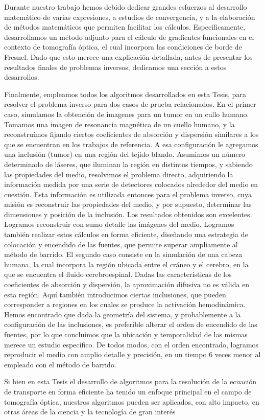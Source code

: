 Durante nuestro trabajo hemos debido dedicar grandes esfuerzos 
al desarrollo matemático de varias expresiones, a estudios de 
convergencia, y a la elaboración de métodos matemáticos que 
permiten facilitar 
los cálculos. Específicamente, desarrollamos un método adjunto para 
el cálculo de gradientes funcionales en el contexto de tomografía óptica, 
el cual incorpora las condiciones de borde de Fresnel. 
Dado que esto merece una explicación detallada,  antes de presentar los resultados finales de problemas 
inversos, dedicamos una sección a estos desarrollos.

Finalmente, empleamos todos los algoritmos desarrollados en esta Tesis, 
para resolver el problema inverso para dos casos de prueba relacionados. 
En el primer caso, simulamos la obtención de imagenes para un tumor 
en un cullo humano. Tomamos una imagen de resonancia magnética de un 
cuello humano, y la reconstruímos fijando ciertos coeficientes de 
absorción y dispersión similares a los que se encuentran en los trabajos 
de referencia. A esa configuración le agregamos una inclusión 
(tumor) en una región del tejido blando. 
Asumimos un número determinado de láseres, que iluminan la región en 
distintos tiempos, y sabiendo las propiedades del medio, resolvimos 
el problema directo, adquiriendo la información medida por una serie 
de detectores colocados alrededor del medio en cuestión.
Esta información es utilizada entonces para el problema inverso, 
cuya misión es reconstruir las propiedades del medio, y por supuesto, 
determinar las dimensiones y posición de la inclusión. 
Los resultados obtenidos son excelentes. Logramos reconstruir con 
sumo detalle las imágenes del medio. Logramos también realizar 
estos cálculos en forma eficiente, diseñando una estrategia de 
colocación y encendido de las fuentes, que permite superar ampliamente al 
método de barrido.
El segundo caso consiste en la simulación de una cabeza humana, 
la cual incorpora la región ubicada entre el cráneo y el 
cerebro, en la que se encuentra el fluido cerebroespinal. 
Dadas las características de los coeficientes de absorción y dispersión, 
la aproximación difusiva no es válida en esta región.
Aquí también introducimos ciertas inclusiones, que pueden corresponder 
a regiones en los cuales se produce la activación hemodinámica. 
Hemos encontrado que dada la geometría del sistema, y probablemente a 
la configuración de las inclusiones, es preferible alterar el 
orden de encendido de las fuentes, por lo que concluímos que la 
ubicación y temporalidad de las mismas merece un estudio específico.
De todos modos, con el orden encontrado, logramos reproducir el 
medio con amplio detalle y precisión, en un tiempo 6 veces menor 
al empleado con el método de barrido.

Si bien en esta Tesis el desarrollo de algoritmos 
para la resolución de la ecuación de transporte en forma eficiente 
ha tenido un enfoque principal en el campo de tomografía óptica, 
nuestros algoritmos pueden ser aplicados, con alto impacto, 
en otras áreas de la ciencia y la tecnología de gran interés~\cite{Howell2010, Thynell1998,Duderstadt1979,Qin2015,Dymond1997,Chandrasekhar1960,Zhu2005,Zhu2010,Vassiliev2010,Bedford2019,Vassiliev2010,Bedford2019,Larsen2006, Sanchez1982, Anli2006,Mishchenko1999, Prasher2003}

 
\pagestyle{empty}
